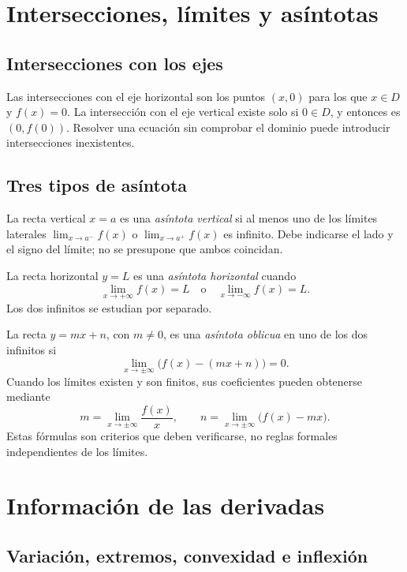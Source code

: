 \section{Intersecciones, límites y asíntotas}
\label{sec:asintotas-estudio}

\subsection{Intersecciones con los ejes}

Las intersecciones con el eje horizontal son los puntos \((x,0)\) para los
que \(x\in D\) y \(f(x)=0\). La intersección con el eje vertical existe solo
si \(0\in D\), y entonces es \((0,f(0))\). Resolver una ecuación sin comprobar
el dominio puede introducir intersecciones inexistentes.

\subsection{Tres tipos de asíntota}

La recta vertical \(x=a\) es una \emph{asíntota vertical} si al menos uno de
los límites laterales \(\lim_{x\to a^-}f(x)\) o
\(\lim_{x\to a^+}f(x)\) es infinito. Debe indicarse el lado y el signo del
límite; no se presupone que ambos coincidan.

La recta horizontal \(y=L\) es una \emph{asíntota horizontal} cuando
\[
  \lim_{x\to+\infty}f(x)=L
  \quad\text{o}\quad
  \lim_{x\to-\infty}f(x)=L.
\]
Los dos infinitos se estudian por separado.

La recta \(y=mx+n\), con \(m\ne0\), es una \emph{asíntota oblicua} en uno
de los dos infinitos si
\[
  \lim_{x\to\pm\infty}\bigl(f(x)-(mx+n)\bigr)=0.
\]
Cuando los límites existen y son finitos, sus coeficientes pueden obtenerse
mediante
\[
  m=\lim_{x\to\pm\infty}\frac{f(x)}{x},
  \qquad
  n=\lim_{x\to\pm\infty}\bigl(f(x)-mx\bigr).
\]
Estas fórmulas son criterios que deben verificarse, no reglas formales
independientes de los límites.

\section{Información de las derivadas}
\label{sec:sintesis-derivadas}

\subsection{Variación, extremos, convexidad e inflexión}

